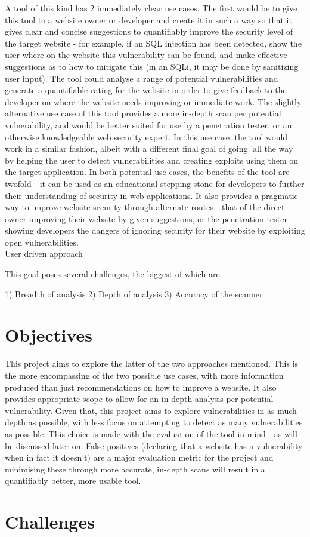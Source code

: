 A tool of this kind has 2 immediately clear use cases. 
The first would be to give this tool to a website owner or developer and create it in such a way so that it gives clear and concise suggestions to quantifiably improve the security level of the target website - for example, if an SQL injection has been detected, show the user where on the website this vulnerability can be found, and make effective suggestions as to how to mitigate this (in an SQLi, it may be done by sanitizing user input). The tool could analyse a range of potential vulnerabilities and generate a quantifiable rating for the website in order to give feedback to the developer on where the website needs improving or immediate work.
The slightly alternative use case of this tool provides a more in-depth scan per potential vulnerability, and would be better suited for use by a penetration tester, or an otherwise knowledgeable web security expert. In this use case, the tool would work in a similar fashion, albeit with a different final goal of going 'all the way' by helping the user to detect vulnerabilities and creating exploits using them on the target application. 
In both potential use cases, the benefits of the tool are twofold - it can be used as an educational stepping stone for developers to further their understanding of security in web applications. It also provides a pragmatic way to improve website security through alternate routes - that of the direct owner improving their website by given suggestions, or the penetration tester showing developers the dangers of ignoring security for their website by exploiting open vulnerabilities. \\





User driven approach



This goal poses several challenges, the biggest of which are:

1) Breadth of analysis
2) Depth of analysis
3) Accuracy of the scanner




\section{Objectives}

This project aims to explore the latter of the two approaches mentioned. This is the more encompassing of the two possible use cases, with more information produced than just recommendations on how to improve a website. It also provides appropriate scope to allow for an in-depth analysis per potential vulnerability. Given that, this project aims to explore vulnerabilities in as much depth as possible, with less focus on attempting to detect as many vulnerabilities as possible. This choice is made with the evaluation of the tool in mind - as will be discussed later on. False positives (declaring that a website has a vulnerability when in fact it doesn't) are a major evaluation metric for the project and minimising these through more accurate, in-depth scans will result in a quantifiably better, more usable tool. \\  


\section{Challenges}


